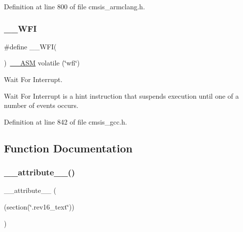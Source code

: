 Definition at line 800 of file cmsis\+\_\+armclang.\+h.

\mbox{\label{group___c_m_s_i_s___core___instruction_interface_gab28e2b328c4cf23c917ab18a23194f8e}} 
\subsubsection{\texorpdfstring{\+\_\+\+\_\+\+W\+FI}{\_\_WFI}\hspace{0.1cm}{\footnotesize\ttfamily [3/3]}}
{\footnotesize\ttfamily \#define \+\_\+\+\_\+\+W\+FI(\begin{DoxyParamCaption}{ }\end{DoxyParamCaption})~\hyperlink{cmsis__iccarm_8h_a1378040bcf22428955c6e3ce9c2053cd}{\+\_\+\+\_\+\+A\+SM} volatile (\char`\"{}wfi\char`\"{})}



Wait For Interrupt. 

Wait For Interrupt is a hint instruction that suspends execution until one of a number of events occurs. 

Definition at line 842 of file cmsis\+\_\+gcc.\+h.



\subsection{Function Documentation}
\mbox{\label{group___c_m_s_i_s___core___instruction_interface_gae84a2733711339c5eefeb0d899506b96}} 
\subsubsection{\texorpdfstring{\+\_\+\+\_\+attribute\+\_\+\+\_\+()}{\_\_attribute\_\_()}\hspace{0.1cm}{\footnotesize\ttfamily [1/3]}}
{\footnotesize\ttfamily \+\_\+\+\_\+attribute\+\_\+\+\_\+ (\begin{DoxyParamCaption}\item[{(section(\char`\"{}.rev16\+\_\+text\char`\"{}))}]{ }\end{DoxyParamCaption})}



